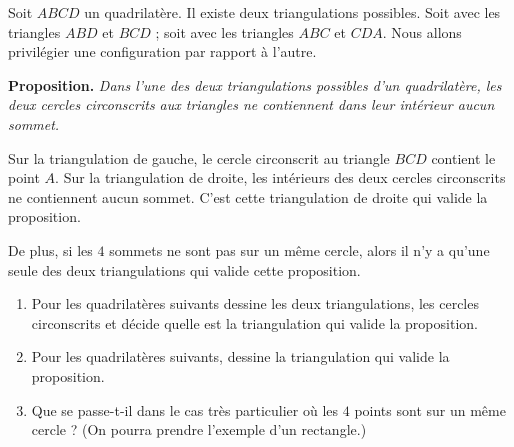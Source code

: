 \documentclass[class=report,crop=false, 12pt]{standalone}
\begin{document}
\begin{activite}

Soit $ABCD$ un quadrilatère. Il existe deux triangulations possibles.
Soit avec les triangles $ABD$ et $BCD$ ; soit avec les triangles $ABC$ et $CDA$.
Nous allons privilégier une configuration par rapport à l'autre.



\begin{center}
\begin{minipage}{0.9\textwidth}
\textbf{Proposition.}
\emph{
Dans l'une des deux triangulations possibles d'un quadrilatère, les deux cercles circonscrits aux triangles ne contiennent dans leur intérieur aucun sommet.
}
\end{minipage}
\end{center}

Sur la triangulation de gauche, le cercle circonscrit au triangle $BCD$ contient le point $A$.
Sur la triangulation de droite, les intérieurs des deux cercles circonscrits ne contiennent aucun sommet. C'est cette triangulation de droite qui valide la proposition. 


De plus, si les $4$ sommets ne sont pas sur un même cercle, alors il n'y a qu'une seule des deux triangulations qui valide cette proposition.


\begin{enumerate}
  \item Pour les quadrilatères suivants dessine les deux triangulations, les cercles circonscrits et décide quelle est la triangulation qui valide la proposition.
  
\bigskip
 

\bigskip

 

\bigskip

  \item Pour les quadrilatères suivants, dessine la triangulation qui valide la proposition.
  
\bigskip
 

\bigskip

\item Que se passe-t-il dans le cas très particulier où les $4$ points 
  sont sur un même cercle ? (On pourra prendre l'exemple d'un rectangle.)
\end{enumerate}


\end{activite}
\end{document}
